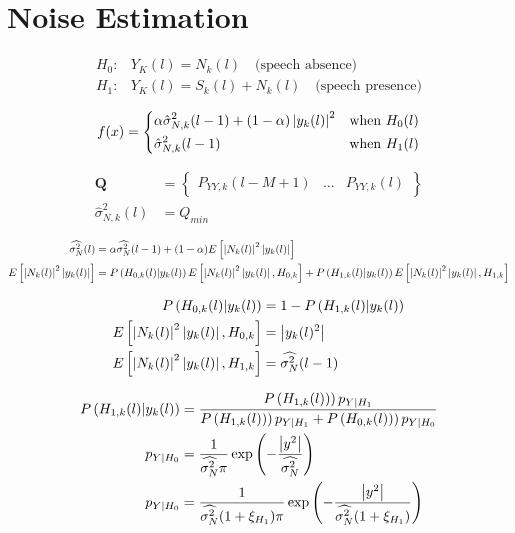 \section{Noise Estimation} \label{sec:noise_estimation}

\begin{align}
  H_{0}: & Y_{K}(l) = N_{k}(l) \quad \text{(speech absence)}
  \label{eq:H0} \\
  H_{1}: & Y_{K}(l) = S_{k}(l) + N_{k}(l) \quad \text{(speech presence)}
  \label{eq:H1}
\end{align}

\begin{equation}
  f(x)=
  \begin{dcases}
      \alpha \hat \sigma_{N,k}^{2}(l-1) + (1-\alpha)\abs{y_{k}(l)}^{2} & \text{when } H_{0}(l)\\
      \hat \sigma_{N,k}^{2}(l-1) & \text{when } H_{1}(l)
  \end{dcases}
  \label{eq:smoothingsigma}
\end{equation}

\begin{align}
  \mathbf{Q} &=
  \begin{Bmatrix}
    P_{YY,k}(l-M+1) & \hdots & P_{YY,k}(l)
  \end{Bmatrix}
  \label{eq:Q} \\
  \hat \sigma_{N,k}^{2}(l) &= Q_{min}
  \label{eq:Qmin}
\end{align}

\begin{align}
  \widehat{\sigma_{N}^{2}}(l) &= \alpha \widehat{\sigma_{N}^{2}}(l-1) + (1-\alpha)E\left[ \abs{N_{k}(l)}^{2}\abs{y_{k}(l)}\right]
  \label{eq:noiseMMSE1} \\
  E\left[ \abs{N_{k}(l)}^{2}\abs{y_{k}(l)}\right] &=
  P\left(H_{0,k}(l)|y_{k}(l)\right) E\left[\abs{N_{k}(l)}^{2}\abs{y_{k}(l)},H_{0,k}\right] +
  P\left(H_{1,k}(l)|y_{k}(l)\right) E\left[\abs{N_{k}(l)}^{2}\abs{y_{k}(l)},H_{1,k}\right]
  \label{eq:noiseMMSE2}
\end{align}

\begin{align}
  P\left(H_{0,k}(l)|y_{k}(l)\right) &= 1 - P\left(H_{1,k}(l)|y_{k}(l)\right)
  \label{eq:MMSEu1} \\
  E\left[\abs{N_{k}(l)}^{2}\abs{y_{k}(l)},H_{0,k}\right] &= \abs{y_{k}(l)^{2}}
  \label{eq:MMSEu2} \\
  E\left[\abs{N_{k}(l)}^{2}\abs{y_{k}(l)},H_{1,k}\right] &= \widehat{\sigma_{N}^{2}}(l-1)
  \label{eq:MMSEu3}
\end{align}

\begin{align}
  P\left(H_{1,k}(l)|y_{k}(l)\right) &= \frac{P\left(H_{1,k}(l))\right)p_{Y|H_{1}}}{P\left(H_{1,k}(l))\right)p_{Y|H_{1}} + P\left(H_{0,k}(l))\right)p_{Y|H_{0}}}
  \label{eq:MMSEu4}\\
  p_{Y|H_{0}} &= \frac{1}{\widehat{\sigma_{N}^{2}} \pi} \exp\left(-\frac{\abs{y^{2}}}{\widehat{\sigma_{N}^{2}}}\right)
  \label{eq:pyh0}\\
  p_{Y|H_{0}} &= \frac{1}{\widehat{\sigma_{N}^{2}} (1+\xi_{H_{1}})\pi} \exp\left(-\frac{\abs{y^{2}}}{\widehat{\sigma_{N}^{2}}(1+\xi_{H_{1}})}\right)
  \label{eq:pyh1}
\end{align}
